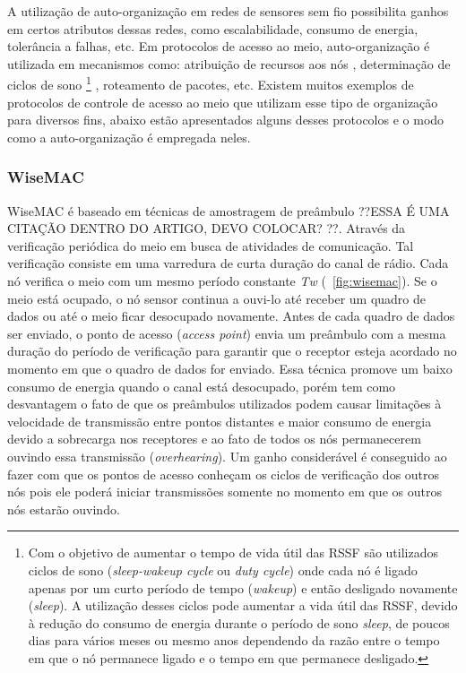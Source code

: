  A utilização de auto-organização em redes de sensores sem fio possibilita ganhos em certos atributos dessas redes, como escalabilidade, consumo de energia, tolerância a falhas, etc. Em protocolos de acesso ao meio, auto-organização é utilizada em mecanismos como: atribuição de recursos aos nós \cite{Dressler2008}, determinação de ciclos de sono%
 \footnote{Com o objetivo de aumentar o tempo de vida útil das RSSF são utilizados ciclos de sono (\textit{sleep-wakeup cycle} ou \textit{duty cycle}) onde cada nó é ligado apenas por um curto período de tempo (\textit{wakeup}) e então desligado novamente (\textit{sleep}). A utilização desses ciclos pode aumentar a vida útil das RSSF, devido à redução do consumo de energia durante o período de sono \textit{sleep}, de poucos dias para vários meses ou mesmo anos dependendo da razão entre o tempo em que o nó permanece ligado e o tempo em que permanece desligado.}
 \cite{Halkes:2005}, roteamento de pacotes, etc. Existem muitos exemplos de protocolos de controle de acesso ao meio que utilizam esse tipo de organização para diversos fins, abaixo estão apresentados alguns desses protocolos e o modo como a auto-organização é empregada neles.
 
 \subsubsection{WiseMAC}
 
 WiseMAC \cite{El-Hoiydi2004} é baseado em técnicas de amostragem de preâmbulo ??ESSA É UMA CITAÇÃO DENTRO DO ARTIGO, DEVO COLOCAR? \cite{El-Hoiydi2002}??. Através da verificação periódica do meio em busca de atividades de comunicação. Tal verificação consiste em uma varredura de curta duração do canal de rádio. Cada nó verifica o meio com um mesmo período constante \textit{Tw} (~\ref{fig:wisemac}). Se o meio está ocupado, o nó sensor continua a ouvi-lo até receber um quadro de dados ou até o meio ficar desocupado novamente. Antes de cada quadro de dados ser enviado, o ponto de acesso (\textit{access point}) envia um preâmbulo com a mesma duração do período de verificação para garantir que o receptor esteja acordado no momento em que o quadro de dados for enviado. Essa técnica promove um baixo consumo de energia quando o canal está desocupado, porém tem como desvantagem o fato de que os preâmbulos utilizados podem causar limitações à velocidade de transmissão entre pontos distantes e maior consumo de energia devido a sobrecarga nos receptores e ao fato de todos os nós permanecerem ouvindo essa transmissão (\textit{overhearing}). Um ganho considerável é conseguido ao fazer com que os pontos de acesso conheçam os ciclos de verificação dos outros nós pois ele poderá iniciar transmissões somente no momento em que os outros nós estarão ouvindo.
 
